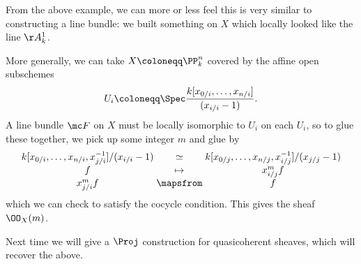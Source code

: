 \documentclass[../notes.tex]{subfiles}
\begin{document}
From the above example, we can more or less feel this is very similar to constructing a line bundle: we built something on $X$ which locally looked like the line $\AA^1_k$.
\begin{example}
	More generally, we can take $X\coloneqq\PP^n_k$ covered by the affine open subschemes
	\[U_i\coloneqq\Spec\frac{k[x_{0/i},\ldots,x_{n/i}]}{(x_{i/i}-1)}.\]
	A line bundle $\mc F$ on $X$ must be locally isomorphic to $U_i$ on each $U_i$, so to glue these together, we pick up some integer $m$ and glue by
	\[\arraycolsep=1.4pt\begin{array}{cccccccc}
		k[x_{0/i},\ldots,x_{n/i},x_{j/i}^{-1}]/(x_{i/i}-1) &\simeq& k[x_{0/j},\ldots,x_{n/j},x_{i/j}^{-1}]/(x_{j/j}-1) \\
		f &\mapsto& x_{i/j}^mf \\
		x_{j/i}^mf &\mapsfrom& f
	\end{array}\]
	which we can check to satisfy the cocycle condition. This gives the sheaf $\OO_X(m)$.
\end{example}
Next time we will give a $\Proj$ construction for quasicoherent sheaves, which will recover the above.
\end{document}
